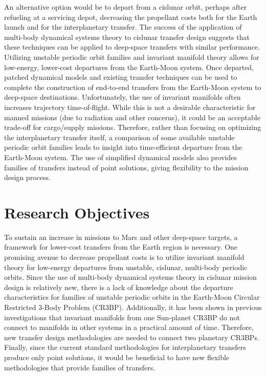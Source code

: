 An alternative option would be to depart from a cislunar orbit, perhaps after refueling at a
servicing depot, decreasing the propellant costs both for the Earth launch and for the
interplanetary transfer. The success of the application of multi-body dynamical systems theory to
cislunar transfer design suggests that these techniques can be applied to deep-space transfers with
similar performance. Utilizing unstable periodic orbit families and invariant manifold theory
allows for low-energy, lower-cost departures from the Earth-Moon system. Once departed, patched
dynamical models and existing transfer techniques can be used to complete the construction of
end-to-end transfers from the Earth-Moon system to deep-space destinations. Unfortunately, the use
of invariant manifolds often increases trajectory time-of-flight. While this is not a desirable
characteristic for manned missions (due to radiation and other concerns), it could be an acceptable
trade-off for cargo/supply missions. Therefore, rather than focusing on optimizing the
interplanetary transfer itself, a comparison of some available unstable periodic orbit families
leads to insight into time-efficient departure from the Earth-Moon system. The use of simplified
dynamical models also provides families of transfers instead of point solutions, giving flexibility
to the mission design process. 

\section{Research Objectives}
To sustain an increase in missions to Mars and other deep-space targets, a framework for lower-cost
transfers from the Earth region is necessary. One promising avenue to decrease propellant costs is
to utilize invariant manifold theory for low-energy departures from unstable, cislunar, multi-body
periodic orbits. Since the use of multi-body dynamical systems theory in cislunar mission design is
relatively new, there is a lack of knowledge about the departure characteristics for families of
unstable periodic orbits in the Earth-Moon Circular Restricted 3-Body Problem (CR3BP). Additionally,
it has been shown in previous investigations that invariant manifolds from one Sun-planet CR3BP
do not connect to manifolds in other systems in a practical amount of time\cite{Koon:2000}.
Therefore, new transfer design methodologies are needed to connect two planetary CR3BPs. Finally,
since the current standard methodologies for interplanetary transfers produce only point solutions,
it would be beneficial to have new flexible methodologies that provide families of transfers.

